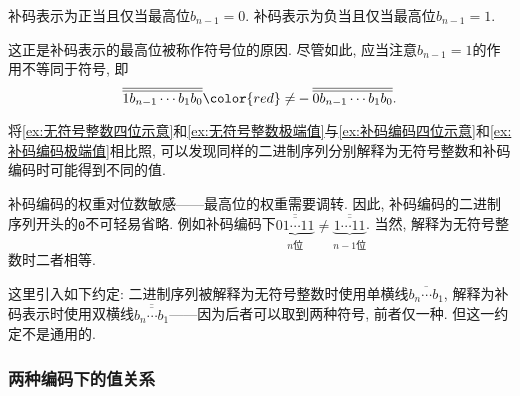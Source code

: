 \documentclass{ctexart}
\def\binaryseq#1{{\texttt{#1}}}
\begin{document}
\begin{finale}
    \begin{theorem}[补码表示的符号]
        补码表示为正当且仅当最高位$b_{n-1}=0$. 补码表示为负当且仅当最高位$b_{n-1}=1$.
    \end{theorem}
\end{finale}
\begin{remark}
    这正是补码表示的最高位被称作符号位的原因. 尽管如此, 应当注意$b_{n-1}=1$的作用不等同于符号, 即
    \[ \overline{\overline{1b_{n-1}\cdots b_1b_0}} {\color{red}\neq} -\overline{\overline{0b_{n-1}\cdots b_1b_0}}. \]
\end{remark}
\begin{pitfall}
    将\cref{ex:无符号整数四位示意}和\cref{ex:无符号整数极端值}与\cref{ex:补码编码四位示意}和\cref{ex:补码编码极端值}相比照, 可以发现同样的二进制序列分别解释为无符号整数和补码编码时可能得到不同的值.
\end{pitfall}
\begin{pitfall}
    补码编码的权重对位数敏感——最高位的权重需要调转. 因此, 补码编码的二进制序列开头的\binaryseq{0}不可轻易省略. 例如补码编码下$\underbrace{\overline{\overline{01\cdots 11}}}_{n\text{位}}\neq \underbrace{\overline{\overline{1\cdots 11}}}_{n-1\text{位}}$. 当然, 解释为无符号整数时二者相等.
\end{pitfall}
\begin{remark}
    这里引入如下约定: 二进制序列被解释为无符号整数时使用单横线$\overline{b_n\cdots b_1}$, 解释为补码表示时使用双横线$\overline{\overline{b_n\cdots b_1}}$——因为后者可以取到两种符号, 前者仅一种. 但这一约定不是通用的.
\end{remark}


\subsubsection{两种编码下的值关系} %
\label{ssub:两种编码下的值关系}
\end{document}
